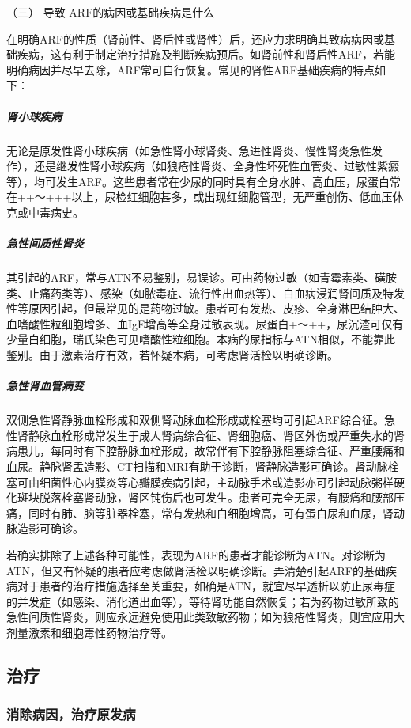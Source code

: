 \hypertarget{text00083.htmlux5cux23CHP3-7-5-5-3}{}
（三） 导致 ARF的病因或基础疾病是什么

在明确ARF的性质（肾前性、肾后性或肾性）后，还应力求明确其致病病因或基础疾病，这有利于制定治疗措施及判断疾病预后。如肾前性和肾后性ARF，若能明确病因并尽早去除，ARF常可自行恢复。常见的肾性ARF基础疾病的特点如下：

\subparagraph{肾小球疾病}

无论是原发性肾小球疾病（如急性肾小球肾炎、急进性肾炎、慢性肾炎急性发作），还是继发性肾小球疾病（如狼疮性肾炎、全身性坏死性血管炎、过敏性紫癜等），均可发生ARF。这些患者常在少尿的同时具有全身水肿、高血压，尿蛋白常在++～+++以上，尿检红细胞甚多，或出现红细胞管型，无严重创伤、低血压休克或中毒病史。

\subparagraph{急性间质性肾炎}

其引起的ARF，常与ATN不易鉴别，易误诊。可由药物过敏（如青霉素类、磺胺类、止痛药类等）、感染（如脓毒症、流行性出血热等）、白血病浸润肾间质及特发性等原因引起，但最常见的是药物过敏。患者可有发热、皮疹、全身淋巴结肿大、血嗜酸性粒细胞增多、血IgE增高等全身过敏表现。尿蛋白+～++，尿沉渣可仅有少量白细胞，瑞氏染色可见嗜酸性粒细胞。本病的尿指标与ATN相似，不能靠此鉴别。由于激素治疗有效，若怀疑本病，可考虑肾活检以明确诊断。

\subparagraph{急性肾血管病变}

双侧急性肾静脉血栓形成和双侧肾动脉血栓形成或栓塞均可引起ARF综合征。急性肾静脉血栓形成常发生于成人肾病综合征、肾细胞癌、肾区外伤或严重失水的肾病患儿，每同时有下腔静脉血栓形成，故常伴有下腔静脉阻塞综合征、严重腰痛和血尿。静脉肾盂造影、CT扫描和MRI有助于诊断，肾静脉造影可确诊。肾动脉栓塞可由细菌性心内膜炎等心瓣膜疾病引起，主动脉手术或造影亦可引起动脉粥样硬化斑块脱落栓塞肾动脉，肾区钝伤后也可发生。患者可完全无尿，有腰痛和腰部压痛，同时有肺、脑等脏器栓塞，常有发热和白细胞增高，可有蛋白尿和血尿，肾动脉造影可确诊。

若确实排除了上述各种可能性，表现为ARF的患者才能诊断为ATN。对诊断为ATN，但又有怀疑的患者应考虑做肾活检以明确诊断。弄清楚引起ARF的基础疾病对于患者的治疗措施选择至关重要，如确是ATN，就宜尽早透析以防止尿毒症的并发症（如感染、消化道出血等），等待肾功能自然恢复；若为药物过敏所致的急性间质性肾炎，则应永远避免使用此类致敏药物；如为狼疮性肾炎，则宜应用大剂量激素和细胞毒性药物治疗等。

\subsection{治疗}

\subsubsection{消除病因，治疗原发病}

